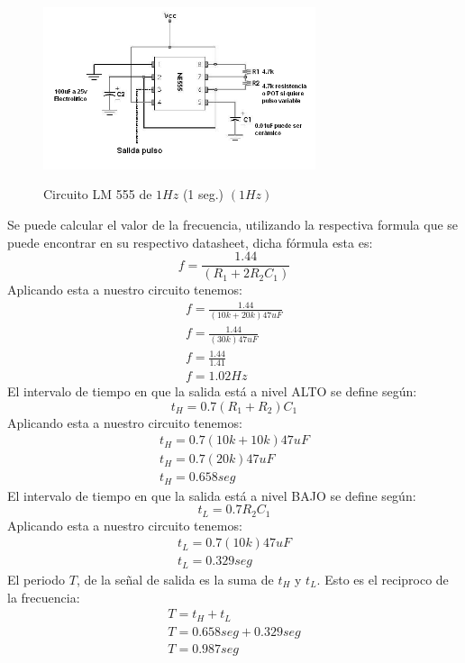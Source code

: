 \begin{figure}[h]
    \begin{center}
    \includegraphics[width=8cm, height=5.5cm]{images/image1.png}
    \newline
    \caption{Circuito LM 555 de $1Hz$ (1 seg.) $\left ( 1Hz \right )$}\label{circuit_diagram}
    \end{center}
\end{figure}
Se puede calcular el valor de la frecuencia, utilizando la respectiva formula que se puede encontrar en su respectivo datasheet, dicha fórmula esta es:
\[
    f=\frac{1.44}{\left ( R_{1}+2R_{2}C_{1} \right )}  
\]
Aplicando esta a nuestro circuito tenemos:
\[\begin{array}{crl}
    f=\frac{1.44}{\left ( 10k+20k \right ) 47uF}
    \\
    f=\frac{1.44}{\left ( 30k \right ) 47uF}
    \\
    f=\frac{1.44}{1.41}
    \\
    f=1.02Hz   
\end{array}\]
El intervalo de tiempo en que la salida está a nivel ALTO se define según:
\[
    t_{H}=0.7\left ( R_{1}+R_{2} \right )C_{1}
\]
Aplicando esta a nuestro circuito tenemos:
\[\begin{array}{crl}
    t_{H}=0.7\left (10k+10k \right )47uF
    \\
    t_{H}=0.7\left ( 20k \right )47uF
    \\
    t_{H}=0.658 seg
\end{array}\]
El intervalo de tiempo en que la salida está a nivel BAJO se define según:
\[
    t_{L}=0.7R_{2}C_{1}
\] 
Aplicando esta a nuestro circuito tenemos:
\[\begin{array}{crl}
    t_{L}=0.7\left ( 10k \right )47uF
    \\ 
    t_{L}=0.329 seg
\end{array}\]
El periodo $T$, de la señal de salida es la suma de $t_{H}$   y  $t_{L}$.  Esto es el reciproco de la frecuencia:
\[\begin{array}{crl}
    T=t_{H}+t_{L}
    \\
    T=0.658seg+0.329seg
    \\
    T=0.987seg
\end{array}\]
